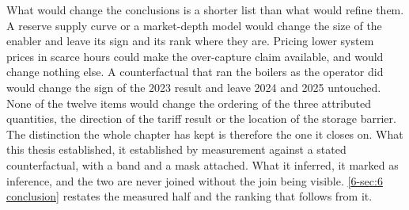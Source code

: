 What would change the conclusions is a shorter list than what would refine them. A reserve supply curve or a market-depth model would change the size of the enabler and leave its sign and its rank where they are. Pricing lower system prices in scarce hours could make the over-capture claim available, and would change nothing else. A counterfactual that ran the boilers as the operator did would change the sign of the 2023 result and leave 2024 and 2025 untouched. None of the twelve items would change the ordering of the three attributed quantities, the direction of the tariff result or the location of the storage barrier. The distinction the whole chapter has kept is therefore the one it closes on. What this thesis established, it established by measurement against a stated counterfactual, with a band and a mask attached. What it inferred, it marked as inference, and the two are never joined without the join being visible. \autoref{6-sec:6 conclusion} restates the measured half and the ranking that follows from it.

\newpage
